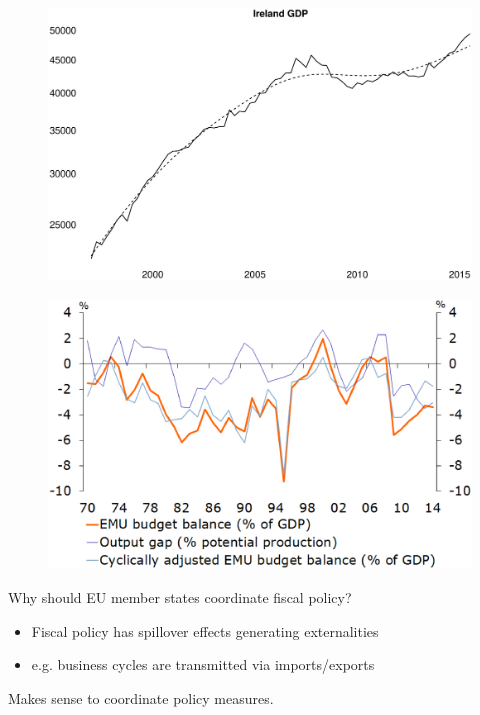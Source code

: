 \documentclass{beamer}
\begin{document}
\begin{frame}
  \begin{figure}
    \includegraphics[scale=.3]{ireland_gdp2.eps}
  \end{figure}
\end{frame}

\begin{frame}
  \begin{figure}
    \includegraphics[scale=.4]{nl_budget.eps}
  \end{figure}
\end{frame}


\begin{frame}  
  Why should EU member states coordinate fiscal policy?
  \begin{itemize}
    \item Fiscal policy has spillover effects generating externalities
    \item e.g. business cycles are transmitted via imports/exports
  \end{itemize}
  \medskip
  Makes sense to coordinate policy measures.  
\end{frame}
\end{document}
